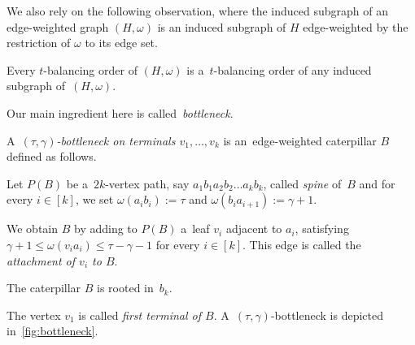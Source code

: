 \documentclass[a4paper,UKenglish,cleveref,hyperref,autoref]{lipics-v2021}
\newcommand{\weight}{\omega}
\begin{document}
We also rely on the following observation, where the induced subgraph of an edge-weighted graph $(H,\weight)$ is an induced subgraph of $H$ edge-weighted by the restriction of $\weight$ to its edge set.
\begin{observation}\label{obs:bo-ind-sub}
  Every $t$-balancing order of $(H,\weight)$ is a~$t$-balancing order of any induced subgraph of~$(H,\weight)$. 
\end{observation}

Our main ingredient here is called~\emph{bottleneck}.

\begin{definition}\label{def:bottleneck}
  A~\emph{$(\tau, \gamma)$-bottleneck on terminals $v_1, \ldots, v_k$} is an~edge-weighted caterpillar $B$ defined as follows.
\begin{compactenum}
\item Let $P(B)$ be a~$2k$-vertex path, say $a_1b_1a_2b_2 \dots a_kb_k$, called \emph{spine} of~$B$ and for every $i \in [k]$, we set $\weight(a_ib_i) := \tau$ and $\weight(b_ia_{i+1}) := \gamma + 1$.
\item We obtain $B$ by adding to $P(B)$ a~leaf $v_i$ adjacent to $a_i$, satisfying $\gamma + 1 \leqslant \weight(v_ia_i) \leqslant \tau - \gamma - 1$ for every $i \in [k]$.
  This edge is called the \emph{attachment of $v_i$ to $B$}.
  \item The caterpillar $B$ is rooted in~$b_k$.
\end{compactenum}
\end{definition}

The vertex $v_1$ is called \emph{first terminal of $B$}.
A~$(\tau, \gamma)$-bottleneck is depicted in~\cref{fig:bottleneck}.
\end{document}
